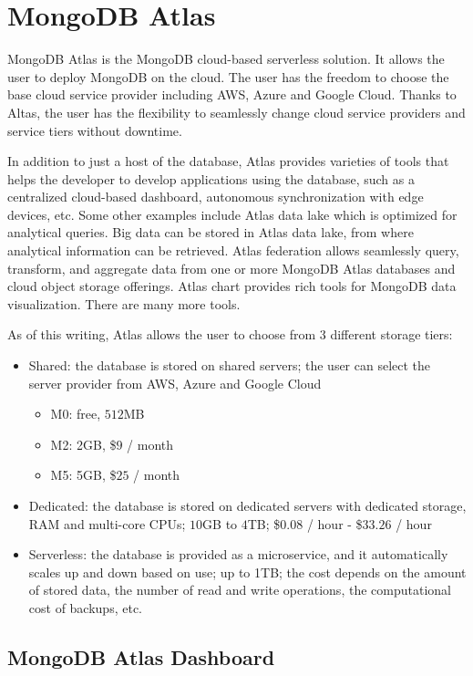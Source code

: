 \section{MongoDB Atlas} \label{sec:mongodb-atlas}

MongoDB Atlas is the MongoDB cloud-based serverless solution. It allows the user to deploy MongoDB on the cloud. The user has the freedom to choose the base cloud service provider including AWS, Azure and Google Cloud. Thanks to Altas, the user has the flexibility to seamlessly change cloud service providers and service tiers without downtime. 

In addition to just a host of the database, Atlas provides varieties of tools that helps the developer to develop applications using the database, such as a centralized cloud-based dashboard, autonomous synchronization with edge devices, etc. Some other examples include Atlas data lake which is optimized for analytical queries. Big data can be stored in Atlas data lake, from where analytical information can be retrieved. Atlas federation allows seamlessly query, transform, and aggregate data from one or more MongoDB Atlas databases and cloud object storage offerings. Atlas chart provides rich tools for MongoDB data visualization. There are many more tools.

As of this writing, Atlas allows the user to choose from 3 different storage tiers:
\begin{itemize}
  \item Shared: the database is stored on shared servers; the user can select the server provider from AWS, Azure and Google Cloud
  \begin{itemize}
    \item M0: free, $512$MB
    \item M2: 2GB, \$$9$ / month
    \item M5: 5GB, \$$25$ / month
  \end{itemize}
  \item Dedicated: the database is stored on dedicated servers with dedicated storage, RAM and multi-core CPUs; $10$GB to $4$TB; \$$0.08$ / hour - \$$33.26$ / hour
  \item Serverless: the database is provided as a microservice, and it automatically scales up and down based on use; up to 1TB; the cost depends on the amount of stored data, the number of read and write operations, the computational cost of backups, etc.
\end{itemize}

\subsection{MongoDB Atlas Dashboard}

